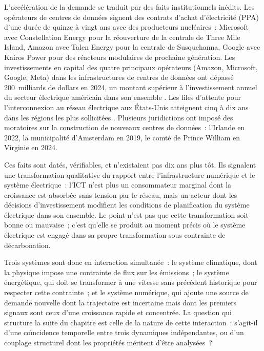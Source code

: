 L'accélération de la demande se traduit par des faits institutionnels inédits. Les opérateurs de centres de données signent des contrats d'achat d'électricité (PPA) d'une durée de quinze à vingt ans avec des producteurs nucléaires~: Microsoft avec Constellation Energy pour la réouverture de la centrale de Three Mile Island, Amazon avec Talen Energy pour la centrale de Susquehanna, Google avec Kairos Power pour des réacteurs modulaires de prochaine génération. Les investissements en capital des quatre principaux opérateurs (Amazon, Microsoft, Google, Meta) dans les infrastructures de centres de données ont dépassé 200~milliards de dollars en 2024, un montant supérieur à l'investissement annuel du secteur électrique américain dans son ensemble \parencite{iea_weo_2024}. Les files d'attente pour l'interconnexion au réseau électrique aux États-Unis atteignent cinq à dix ans dans les régions les plus sollicitées \parencite{rand_queued_2024}. Plusieurs juridictions ont imposé des moratoires sur la construction de nouveaux centres de données~: l'Irlande en 2022, la municipalité d'Amsterdam en 2019, le comté de Prince William en Virginie en 2024.

Ces faits sont datés, vérifiables, et n'existaient pas dix ans plus tôt. Ils signalent une transformation qualitative du rapport entre l'infrastructure numérique et le système électrique~: l'ICT n'est plus un consommateur marginal dont la croissance est absorbée sans tension par le réseau, mais un acteur dont les décisions d'investissement modifient les conditions de planification du système électrique dans son ensemble. Le point n'est pas que cette transformation soit bonne ou mauvaise~; c'est qu'elle se produit au moment précis où le système électrique est engagé dans sa propre transformation sous contrainte de décarbonation.

Trois systèmes sont donc en interaction simultanée~: le système climatique, dont la physique impose une contrainte de flux sur les émissions~; le système énergétique, qui doit se transformer à une vitesse sans précédent historique pour respecter cette contrainte~; et le système numérique, qui ajoute une source de demande nouvelle dont la trajectoire est incertaine mais dont les premiers signaux sont ceux d'une croissance rapide et concentrée. La question qui structure la suite du chapitre est celle de la nature de cette interaction~: s'agit-il d'une coïncidence temporelle entre trois dynamiques indépendantes, ou d'un couplage structurel dont les propriétés méritent d'être analysées~?


